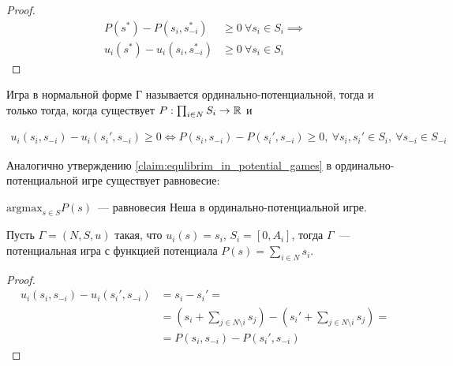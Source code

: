 \documentclass[../main.tex]{subfiles}
\begin{document}
\begin{proof}
	\begin{align*}
		P(s^*) - P(s_i, s_{-i}^*) &\geqslant 0 \ \forall s_i \in S_i \implies \\
		u_i(s^*) - u_i(s_i, s^*_{-i}) &\geqslant 0 \ \forall s_i \in S_i
	\end{align*}
\end{proof}

\begin{df}
	Игра в нормальной форме Г называется ординально-потенциальной, тогда и только тогда, когда существует $P: \prod_{i \in N} S_i \to \mathbb{R}$ и

	\begin{align*}
		u_i(s_i, s_{-i}) - u_i(s_i', s_{-i}) \geqslant 0 \iff P(s_i, s_{-i}) - P(s_i', s_{-i}) \geqslant 0, \ \forall s_i, s_i' \in S_i, \ \forall s_{-i} \in S_{-i}
	\end{align*}

\end{df}

Аналогично утверждению \ref{claim:equlibrim_in_potential_games} в ординально-потенциальной игре существует равновесие:

\begin{claim}
  $\text{argmax}_{s\in S} P(s)$~--- равновесия Неша в ординально-потенциальной игре.  
\end{claim}

\begin{exmpl}
	Пусть $\Gamma = (N, S, u)$ такая, что $u_i(s) = s_i$, $S_i = [0, A_i]$, тогда  $\Gamma$~--- потенциальная игра с функцией потенциала $P(s) = \sum_{i \in N} s_i$.

	\begin{proof}
		
	  \begin{align*}
		u_i(s_i, s_{-i}) - u_i(s_i', s_{-i}) &= s_i - s_i' = \\
						     &= \left(s_i + \sum_{j \in N \setminus i} s_j\right) - \left(s_i' + \sum_{j \in N \setminus i} s_j\right) = \\ 
						     &= P(s_i, s_{-i}) - P(s_i', s_{-i})
	  \end{align*}
	\end{proof}
\end{exmpl}
\end{document}
